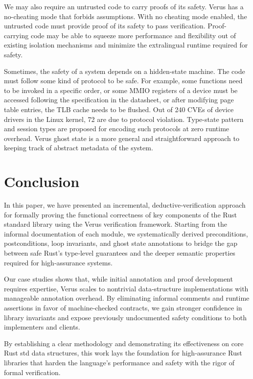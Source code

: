 \documentclass[conference]{IEEEtran}
\begin{document}
We may also require an untrusted code to carry proofs of its safety. Verus has a no-cheating mode that forbids assumptions. With no cheating mode enabled, the untrusted code must provide proof of its safety to pass verification. Proof-carrying code may be able to squeeze more performance and flexibility out of existing isolation mechanisms and minimize the extralingual runtime required for safety.

Sometimes, the safety of a system depends on a hidden-state machine. The code must follow some kind of protocol to be safe. For example, some functions need to be invoked in a specific order, or some MMIO registers of a device must be accessed following the specification in the datasheet, or after modifying page table entries, the TLB cache needs to be flushed. Out of 240 CVEs of device drivers in the Linux kernel, 72 are due to protocol violation\cite{RFL_security}. Type-state pattern and session types\cite{sessiontype} are proposed for encoding such protocols at zero runtime overhead. Verus ghost state is a more general and straightforward approach to keeping track of abstract metadata of the system.       

\section{Conclusion}
In this paper, we have presented an incremental, deductive‐verification approach for formally proving the functional correctness of key components of the Rust standard library using the Verus verification framework. Starting from the informal documentation of each module, we systematically derived preconditions, postconditions, loop invariants, and ghost state annotations to bridge the gap between safe Rust’s type‐level guarantees and the deeper semantic properties required for high‐assurance systems.

Our case studies shows that, while initial annotation and proof development requires expertise, Verus scales to nontrivial data‐structure implementations with manageable annotation overhead. By eliminating informal comments and runtime assertions in favor of machine‐checked contracts, we gain stronger confidence in library invariants and expose previously undocumented safety conditions to both implementers and clients.


By establishing a clear methodology and demonstrating its effectiveness on core Rust std data structures, this work lays the foundation for high‐assurance Rust libraries that harden the language’s performance and safety with the rigor of formal verification.
\end{document}
